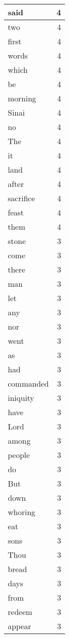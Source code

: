 \begin{center}
\begin{longtable}{l|r}
said & 4 \\ \hline
two & 4 \\ \hline
first & 4 \\ \hline
words & 4 \\ \hline
which & 4 \\ \hline
be & 4 \\ \hline
morning & 4 \\ \hline
Sinai & 4 \\ \hline
no & 4 \\ \hline
The & 4 \\ \hline
it & 4 \\ \hline
land & 4 \\ \hline
after & 4 \\ \hline
sacrifice & 4 \\ \hline
feast & 4 \\ \hline
them & 4 \\ \hline
stone & 3 \\ \hline
come & 3 \\ \hline
there & 3 \\ \hline
man & 3 \\ \hline
let & 3 \\ \hline
any & 3 \\ \hline
nor & 3 \\ \hline
went & 3 \\ \hline
as & 3 \\ \hline
had & 3 \\ \hline
commanded & 3 \\ \hline
iniquity & 3 \\ \hline
have & 3 \\ \hline
Lord & 3 \\ \hline
among & 3 \\ \hline
people & 3 \\ \hline
do & 3 \\ \hline
But & 3 \\ \hline
down & 3 \\ \hline
whoring & 3 \\ \hline
eat & 3 \\ \hline
sons & 3 \\ \hline
Thou & 3 \\ \hline
bread & 3 \\ \hline
days & 3 \\ \hline
from & 3 \\ \hline
redeem & 3 \\ \hline
appear & 3 \\ \hline

\end{longtable}
\end{center}
